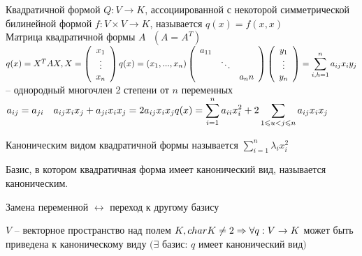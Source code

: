 \begin{Def} 
	Квадратичной формой $Q: V \to K$, ассоциированной с некоторой симметрической билинейной формой $f: V \times V \to K$, называется $q(x)=f(x,x)$\\
	Матрица квадратичной формы $A \ \ \ (A = A^T)$ \ \ \ $q(x) = X^TAX, X = \left(
		\begin{array}{ccc}	
			x_1\\
			\vdots\\
			x_n
		\end{array}\right)\\
		q(x) = (x_1, ..., x_n)\left(
			\begin{array}{ccc}	
				a_{11} & & \\
				& \ddots & \\
				& &a_nn
			\end{array}\right)\left(
			\begin{array}{ccc}	
				y_1\\
				\vdots\\
				y_n
			\end{array}\right) = \displaystyle \sum_{i,h = 1}^{n} a_{ij}x_iy_j$ -- однородный многочлен 2 степени от $n$ переменных\\
			$a_{ij} = a_{ji} \ \ \ a_{ij}x_ix_j+a_{ji}x_ix_j = 2a_{ij}x_ix_j\\
			\displaystyle q(x) = \sum_{i=1}^{n} a_{ii} x_i^2 + 2 \sum_{1 \leqslant u < j \leqslant n} a_{ij} x_ix_j$
\end{Def} 

\begin{Def} 
	Каноническим видом квадратичной формы называется $\sum_{i=1}^{n} \lambda_i x^2_i $
\end{Def} 

\begin{Def} 
	Базис, в котором квадратичная форма имеет канонический вид, называется каноническим.
\end{Def} 

\begin{Rem}
	Замена переменной $\leftrightarrow$ переход к другому базису
\end{Rem}

\begin{Thm} 
	$V$ -- векторное пространство над полем $K, \\ char K \neq 2 \Rightarrow
	\forall q: V \to K$ может быть приведена к каноническому виду $(\exists$ базис: $q$ имеет канонический вид$)$
\end{Thm} 

